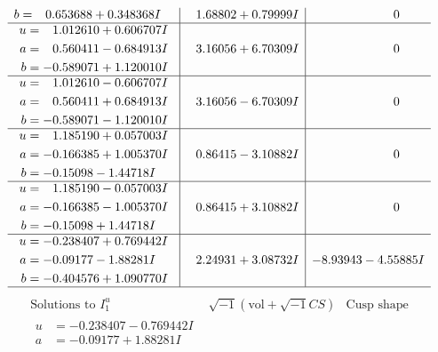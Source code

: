 \documentclass[1p]{elsarticle_modified}
\theoremstyle{definition}
\newcommand{\I}{\sqrt{-1}}
\begin{document}
$$\begin{array}{c|c|c}
\begin{aligned}
b &= \phantom{-}0.653688 + 0.348368 I\end{aligned}
 & \phantom{-}1.68802 + 0.79999 I & \phantom{-0.000000 } 0 \\ \hline\begin{aligned}
u &= \phantom{-}1.012610 + 0.606707 I \\
a &= \phantom{-}0.560411 - 0.684913 I \\
b &= -0.589071 + 1.120010 I\end{aligned}
 & \phantom{-}3.16056 + 6.70309 I & \phantom{-0.000000 } 0 \\ \hline\begin{aligned}
u &= \phantom{-}1.012610 - 0.606707 I \\
a &= \phantom{-}0.560411 + 0.684913 I \\
b &= -0.589071 - 1.120010 I\end{aligned}
 & \phantom{-}3.16056 - 6.70309 I & \phantom{-0.000000 } 0 \\ \hline\begin{aligned}
u &= \phantom{-}1.185190 + 0.057003 I \\
a &= -0.166385 + 1.005370 I \\
b &= -0.15098 - 1.44718 I\end{aligned}
 & \phantom{-}0.86415 - 3.10882 I & \phantom{-0.000000 } 0 \\ \hline\begin{aligned}
u &= \phantom{-}1.185190 - 0.057003 I \\
a &= -0.166385 - 1.005370 I \\
b &= -0.15098 + 1.44718 I\end{aligned}
 & \phantom{-}0.86415 + 3.10882 I & \phantom{-0.000000 } 0 \\ \hline\begin{aligned}
u &= -0.238407 + 0.769442 I \\
a &= -0.09177 - 1.88281 I \\
b &= -0.404576 + 1.090770 I\end{aligned}
 & \phantom{-}2.24931 + 3.08732 I & -8.93943 - 4.55885 I\\
 \hline 
 \end{array}$$\newpage$$\begin{array}{c|c|c}  
\text{Solutions to }I^u_{1}& \I (\text{vol} + \sqrt{-1}CS) & \text{Cusp shape}\\
 \hline 
\begin{aligned}
u &= -0.238407 - 0.769442 I \\
a &= -0.09177 + 1.88281 I \\

\end{aligned}
\end{array}$$
\end{document}
